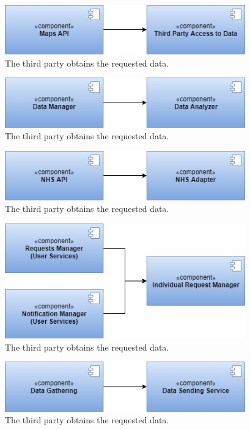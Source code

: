 \begin{figure}
    \centering
    \includegraphics[width=295pt]{images/IntegrationSequence/TrackMe-Integration_sequence6.jpg}
    \caption{The third party obtains the requested data.}
\end{figure}
\begin{figure}
    \centering
    \includegraphics[width=295pt]{images/IntegrationSequence/TrackMe-Integration_sequence7.jpg}
    \caption{The third party obtains the requested data.}
\end{figure}
\begin{figure}
    \centering
    \includegraphics[width=295pt]{images/IntegrationSequence/TrackMe-Integration_sequence8.jpg}
    \caption{The third party obtains the requested data.}
\end{figure}
\begin{figure}
    \centering
    \includegraphics[width=295pt]{images/IntegrationSequence/TrackMe-Integration_sequence9.jpg}
    \caption{The third party obtains the requested data.}
\end{figure}
\begin{figure}
    \centering
    \includegraphics[width=295pt]{images/IntegrationSequence/TrackMe-Integration_sequence10.jpg}
    \caption{The third party obtains the requested data.}
\end{figure}

